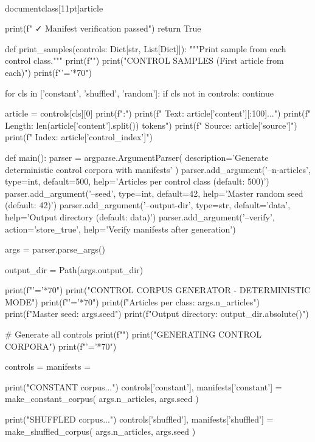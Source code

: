\\documentclass[11pt]{article}
\begin{document}
\begin{CodeBlock}
{{{    print(f"  ✓ Manifest verification passed")
    return True


def print_samples(controls: Dict[str, List[Dict]]):
    """Print sample from each control class."""
    print(f"")
    print("CONTROL SAMPLES (First article from each)")
    print(f"{'='*70}")
    
    for cls in ['constant', 'shuffled', 'random']:
        if cls not in controls:
            continue
            
        article = controls[cls][0]
        print(f":")
        print(f"  Text: {article['content'][:100]}...")
        print(f"  Length: {len(article['content'].split())} tokens")
        print(f"  Source: {article['source']}")
        print(f"  Index: {article['control_index']}")


def main():
    parser = argparse.ArgumentParser(
        description='Generate deterministic control corpora with manifests'
    )
    parser.add_argument('--n-articles', type=int, default=500,
                       help='Articles per control class (default: 500)')
    parser.add_argument('--seed', type=int, default=42,
                       help='Master random seed (default: 42)')
    parser.add_argument('--output-dir', type=str, default='data',
                       help='Output directory (default: data)')
    parser.add_argument('--verify', action='store_true',
                       help='Verify manifests after generation')
    
    args = parser.parse_args()
    
    output_dir = Path(args.output_dir)
    
    print(f"{'='*70}")
    print("CONTROL CORPUS GENERATOR - DETERMINISTIC MODE")
    print(f"{'='*70}")
    print(f"Articles per class: {args.n_articles}")
    print(f"Master seed: {args.seed}")
    print(f"Output directory: {output_dir.absolute()}")
    
    # Generate all controls
    print(f"")
    print("GENERATING CONTROL CORPORA")
    print(f"{'='*70}")
    
    controls = {}
    manifests = {}
    
    print("\n[1/3] CONSTANT corpus...")
    controls['constant'], manifests['constant'] = make_constant_corpus(
        args.n_articles, args.seed
    )
    
    print("\n[2/3] SHUFFLED corpus...")
    controls['shuffled'], manifests['shuffled'] = make_shuffled_corpus(
        args.n_articles, args.seed
    )
    
}}}
\end{CodeBlock}
\end{document}
